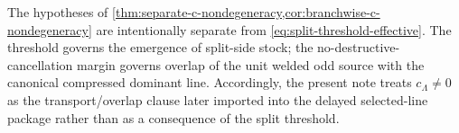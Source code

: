 \begin{remark}
\label{rem:separate-c-nondegeneracy}
The hypotheses of \cref{thm:separate-c-nondegeneracy,cor:branchwise-c-nondegeneracy} are
intentionally separate from \eqref{eq:split-threshold-effective}.
The threshold governs the emergence of split-side stock; the no-destructive-cancellation margin
governs overlap of the unit welded odd source with the canonical compressed dominant line.
Accordingly, the present note treats \(c_{\Lambda}\neq 0\) as the transport/overlap clause later
imported into the delayed selected-line package rather than as a consequence of the split
threshold.
\end{remark}
